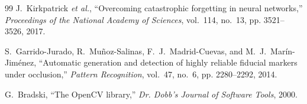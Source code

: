 \documentclass[letterpaper, 10pt, conference]{ieeeconf}
\begin{document}
\begin{thebibliography}{99}
J.~Kirkpatrick \emph{et al.}, ``Overcoming catastrophic forgetting in neural
networks,'' \emph{Proceedings of the National Academy of Sciences}, vol.~114,
no.~13, pp. 3521--3526, 2017.

S.~Garrido-Jurado, R.~Mu\~{n}oz-Salinas, F.~J.~Madrid-Cuevas, and
M.~J.~Mar\'{i}n-Jim\'{e}nez, ``Automatic generation and detection of highly
reliable fiducial markers under occlusion,'' \emph{Pattern Recognition},
vol.~47, no.~6, pp. 2280--2292, 2014.

G.~Bradski, ``The OpenCV library,'' \emph{Dr. Dobb's Journal of Software
Tools}, 2000.

\end{thebibliography}
\end{document}
